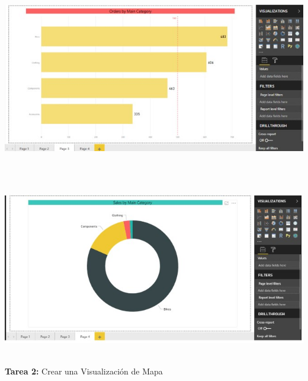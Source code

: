 \begin{flushleft}
\begin{itemize}
\textbf{ }\\
\textbf{ }\\
\begin{center}
	\includegraphics[width=15cm]{./Imagenes/image37} 
	\end{center}
\textbf{ }\\
\textbf{ }\\
\begin{center}
	\includegraphics[width=15cm]{./Imagenes/image38} 
	\end{center}
\textbf{ }\\


\textbf{Tarea 2: } Crear una Visualización de Mapa \\
\textbf{ }\\


\end{itemize}
\end{flushleft}
